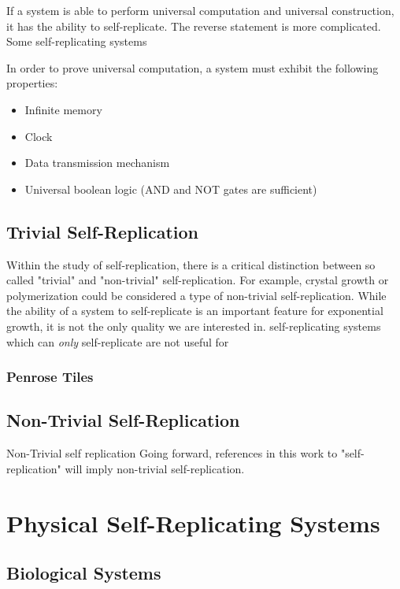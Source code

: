 {If a system is able to perform universal computation and universal construction, it has the ability to self-replicate.  The reverse statement is more complicated.  Some self-replicating systems

In order to prove universal computation, a system must exhibit the following properties:
\begin{itemize}
  \item Infinite memory
  \item Clock
  \item Data transmission mechanism
  \item Universal boolean logic (AND and NOT gates are sufficient)
\end{itemize}




\subsection{Trivial Self-Replication}

Within the study of self-replication, there is a critical distinction between so called "trivial" and "non-trivial" self-replication.
For example, crystal growth or polymerization could be considered a type of non-trivial self-replication.
While the ability of a system to self-replicate is an important feature for exponential growth, it is not the only quality we are interested in.
self-replicating systems which can \textit{only} self-replicate are not useful for 

\subsubsection{Penrose Tiles}

\cite{Penrose1958}

\subsection{Non-Trivial Self-Replication}

Non-Trivial self replication
Going forward, references in this work to "self-replication" will imply non-trivial self-replication.

\section{Physical Self-Replicating Systems}

\subsection{Biological Systems}

}
